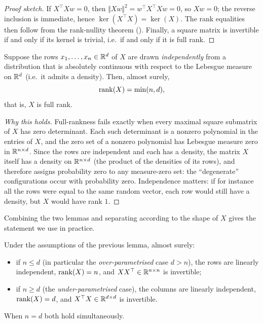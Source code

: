 \begin{proof}[Proof sketch]
If $X^\top X w = 0$, then $\Vert X w \Vert^2 = w^\top X^\top X w = 0$, so $X w = 0$; the reverse inclusion is immediate, hence $\ker(X^\top X) = \ker(X)$. The rank equalities then follow from the rank-nullity theorem (). Finally, a square matrix is invertible if and only if its kernel is trivial, i.e.\ if and only if it is full rank.
\end{proof}

\begin{lemma}
Suppose the rows $x_1, \dots, x_n \in \mathbb{R}^d$ of $X$ are drawn \emph{independently} from a distribution that is absolutely continuous with respect to the Lebesgue measure on $\mathbb{R}^d$ (i.e.\ it admits a density). Then, almost surely,
\[
\operatorname{rank}(X) = \min(n, d),
\]
that is, $X$ is full rank.
\end{lemma}

\begin{proof}[Why this holds]
Full-rankness fails exactly when every maximal square submatrix of $X$ has zero determinant. Each such determinant is a nonzero polynomial in the entries of $X$, and the zero set of a nonzero polynomial has Lebesgue measure zero in $\mathbb{R}^{n \times d}$. Since the rows are independent and each has a density, the matrix $X$ itself has a density on $\mathbb{R}^{n \times d}$ (the product of the densities of its rows), and therefore assigns probability zero to any measure-zero set: the ``degenerate'' configurations occur with probability zero. Independence matters: if for instance all the rows were equal to the same random vector, each row would still have a density, but $X$ would have rank $1$.
\end{proof}

Combining the two lemmas and separating according to the shape of $X$ gives the statement we use in practice.

\begin{corollary}
Under the assumptions of the previous lemma, almost surely:
\begin{itemize}
    \item if $n \leq d$ (in particular the \emph{over-parametrised} case $d > n$), the rows are linearly independent, $\operatorname{rank}(X) = n$, and $X X^\top \in \mathbb{R}^{n \times n}$ is invertible;
    \item if $n \geq d$ (the \emph{under-parametrised} case), the columns are linearly independent, $\operatorname{rank}(X) = d$, and $X^\top X \in \mathbb{R}^{d \times d}$ is invertible.
\end{itemize}
When $n = d$ both hold simultaneously.
\end{corollary}

